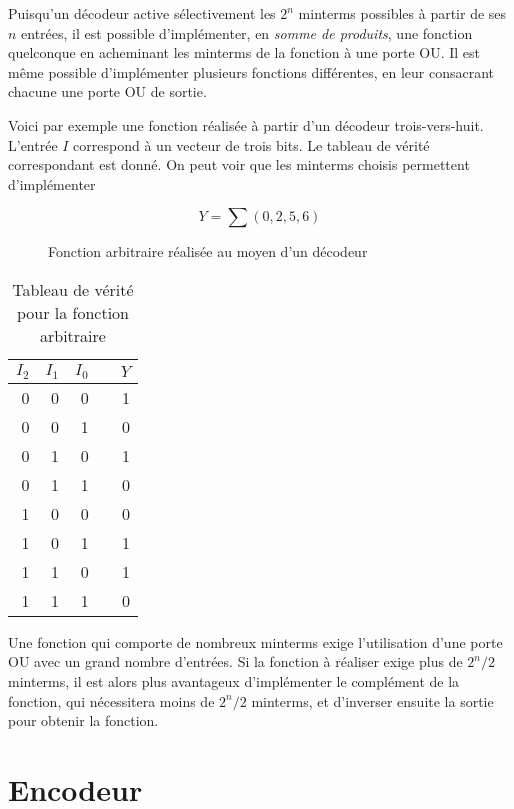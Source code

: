 \documentclass[letter, oneside]{book}
\begin{document}
\begin{enumerate}
Puisqu'un décodeur active sélectivement les \(2^n\) minterms possibles
à partir de ses \(n\) entrées, il est possible d'implémenter, en \emph{somme
de produits}, une fonction quelconque en acheminant les minterms de la
fonction à une porte OU. Il est même possible d'implémenter plusieurs
fonctions différentes, en leur consacrant chacune une porte OU de
sortie.

Voici par exemple une fonction réalisée à partir d'un décodeur
trois-vers-huit. L'entrée \(I\) correspond à un vecteur de trois bits. Le
tableau de vérité correspondant est donné. On peut voir que les
minterms choisis permettent d'implémenter

$$ Y = \sum(0,2,5,6)$$

\begin{figure}[htbp]
\centering

\caption{\label{fig:org5364d42}Fonction arbitraire réalisée au moyen d'un décodeur}
\end{figure}


\begin{table}[htbp]
\caption{\label{tab:org87319d5}Tableau de vérité pour la fonction arbitraire}
\centering
\begin{tabular}{rrrlr}
\(I_2\) & \(I_1\) & \(I_0\) &  & \(Y\)\\[0pt]
\hline
0 & 0 & 0 &  & 1\\[0pt]
0 & 0 & 1 &  & 0\\[0pt]
0 & 1 & 0 &  & 1\\[0pt]
0 & 1 & 1 &  & 0\\[0pt]
1 & 0 & 0 &  & 0\\[0pt]
1 & 0 & 1 &  & 1\\[0pt]
1 & 1 & 0 &  & 1\\[0pt]
1 & 1 & 1 &  & 0\\[0pt]
\end{tabular}
\end{table}

Une fonction qui comporte de nombreux minterms exige l'utilisation
d'une porte OU avec un grand nombre d'entrées. Si la fonction à
réaliser exige plus de \(2^n/2\) minterms, il est alors plus
avantageux d'implémenter le complément de la fonction, qui nécessitera
moins de \(2^n/2\) minterms, et d'inverser ensuite la sortie pour
obtenir la fonction.
\end{enumerate}

\section{Encodeur}
\label{sec:orgb1453b0}
\end{document}
